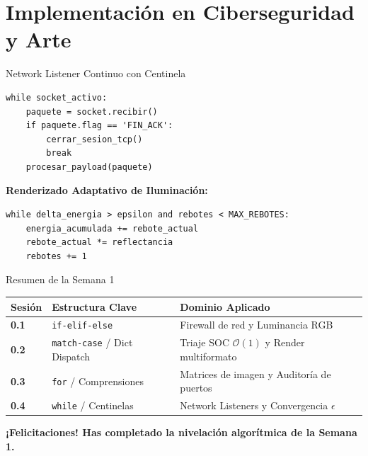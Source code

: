 \documentclass[aspectratio=169]{beamer}
\begin{document}
\section{Implementación en Ciberseguridad y Arte}

\begin{frame}[fragile]{Network Listener Continuo con Centinela}
\begin{lstlisting}
while socket_activo:
    paquete = socket.recibir()
    if paquete.flag == 'FIN_ACK':
        cerrar_sesion_tcp()
        break
    procesar_payload(paquete)
\end{lstlisting}
    \vspace{0.2cm}
    \textbf{Renderizado Adaptativo de Iluminación:}
\begin{lstlisting}
while delta_energia > epsilon and rebotes < MAX_REBOTES:
    energia_acumulada += rebote_actual
    rebote_actual *= reflectancia
    rebotes += 1
\end{lstlisting}
\end{frame}

\begin{frame}{Resumen de la Semana 1}
    \begin{center}
    \begin{tabular}{lll}
        \toprule
        \textbf{Sesión} & \textbf{Estructura Clave} & \textbf{Dominio Aplicado} \\
        \midrule
        \textbf{0.1} & \texttt{if-elif-else} & Firewall de red y Luminancia RGB \\
        \textbf{0.2} & \texttt{match-case} / Dict Dispatch & Triaje SOC $\mathcal{O}(1)$ y Render multiformato \\
        \textbf{0.3} & \texttt{for} / Comprensiones & Matrices de imagen y Auditoría de puertos \\
        \textbf{0.4} & \texttt{while} / Centinelas & Network Listeners y Convergencia $\epsilon$ \\
        \bottomrule
    \end{tabular}
    \end{center}
    \vspace{0.3cm}
    \textbf{¡Felicitaciones! Has completado la nivelación algorítmica de la Semana 1.}
\end{frame}
\end{document}

